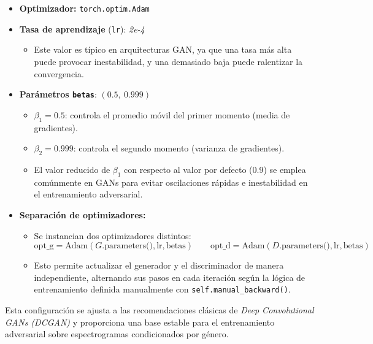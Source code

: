 \begin{itemize}
    \item \textbf{Optimizador:} \texttt{torch.optim.Adam}
    \item \textbf{Tasa de aprendizaje} (\texttt{lr}): \textit{2e-4}
    \begin{itemize}
        \item Este valor es típico en arquitecturas GAN, ya que una tasa más alta puede provocar inestabilidad, y una demasiado baja puede ralentizar la convergencia.
    \end{itemize}
    \item \textbf{Parámetros \texttt{betas}}: $(0.5,\ 0.999)$
    \begin{itemize}
        \item $\beta_1 = 0.5$: controla el promedio móvil del primer momento (media de gradientes).
        \item $\beta_2 = 0.999$: controla el segundo momento (varianza de gradientes).
        \item El valor reducido de $\beta_1$ con respecto al valor por defecto (0.9) se emplea comúnmente en GANs para evitar oscilaciones rápidas e inestabilidad en el entrenamiento adversarial.
    \end{itemize}
    \item \textbf{Separación de optimizadores:}
    \begin{itemize}
        \item Se instancian dos optimizadores distintos:
        \[
        \text{opt\_g} = \text{Adam}(G.\text{parameters()}, \text{lr}, \text{betas})
        \qquad
        \text{opt\_d} = \text{Adam}(D.\text{parameters()}, \text{lr}, \text{betas})
        \]
        \item Esto permite actualizar el generador y el discriminador de manera independiente, alternando sus pasos en cada iteración según la lógica de entrenamiento definida manualmente con \texttt{self.manual\_backward()}.
    \end{itemize}
\end{itemize}

\noindent Esta configuración se ajusta a las recomendaciones clásicas de \textit{Deep Convolutional GANs (DCGAN)} y proporciona una base estable para el entrenamiento adversarial sobre espectrogramas condicionados por género.

